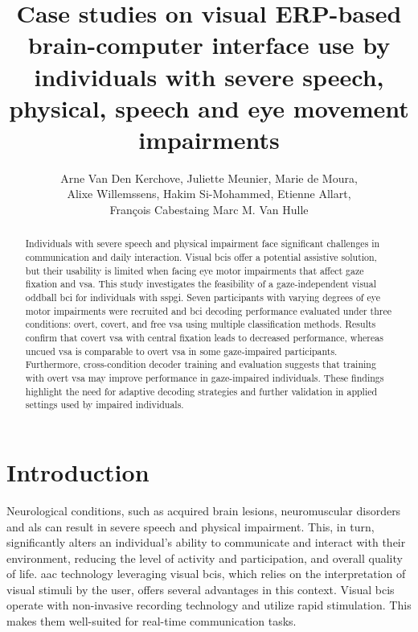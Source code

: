 \documentclass[twocolumn]{article}
\author{
	Arne Van Den Kerchove,
	Juliette Meunier,
	Marie de Moura, \\
	Alixe Willemssens,
	Hakim Si-Mohammed,
	Etienne Allart, \\
	François Cabestaing
	Marc M. Van Hulle
}
\title{Case studies on visual ERP-based brain-computer interface use by
	individuals with severe speech, physical, speech and eye movement impairments}
\begin{document}
\maketitle

\begin{abstract}
	Individuals with severe speech and physical impairment face significant challenges in
	communication and	daily interaction.
	Visual \acp{bci} offer a potential assistive solution, but their usability is
	limited when facing eye motor impairments that affect gaze fixation
	and \ac{vsa}.
	This study investigates the feasibility of a gaze-independent visual oddball
	\ac{bci} for individuals with \ac{sspgi}.
	Seven participants with varying degrees of eye motor impairments were
	recruited and \ac{bci} decoding performance evaluated under three conditions:
	overt, covert, and free \ac{vsa} using multiple classification methods.
	Results confirm that covert \ac{vsa} with central fixation leads to decreased
	performance, whereas uncued \ac{vsa} is comparable to overt \ac{vsa} in some
	gaze-impaired participants.
	Furthermore, cross-condition decoder training and evaluation suggests that training
	with overt \ac{vsa} may improve performance in gaze-impaired individuals.
	These findings highlight the need for adaptive decoding strategies and further
	validation in applied settings used by impaired individuals.
\end{abstract}

\acresetall
\section{Introduction}
Neurological conditions, such as acquired brain lesions,
neuromuscular disorders and \ac{als} can result in severe speech and physical impairment.
This, in turn, significantly alters an individual's ability to communicate and interact
with their environment, reducing the level of activity and participation,
and overall quality of life.
\Ac{aac} technology leveraging visual \acp{bci},
which relies on the interpretation of visual stimuli by the user,
offers several advantages in this context.
Visual \acp{bci} operate with non-invasive recording technology and utilize rapid stimulation.
This makes them well-suited for real-time communication tasks.
\end{document}
